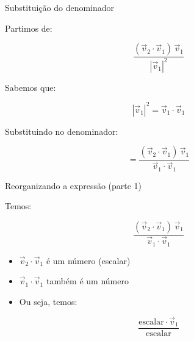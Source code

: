 \documentclass{beamer}
\begin{document}
\begin{frame}{Substituição do denominador}


\vspace{0.5cm}

Partimos de:

\[
\frac{(\vec{v}_2 \cdot \vec{v}_1)\,\vec{v}_1}{|\vec{v}_1|^2}
\]


\vspace{0.5cm}

Sabemos que:

\[
|\vec{v}_1|^2 = \vec{v}_1 \cdot \vec{v}_1
\]


\vspace{0.5cm}

Substituindo no denominador:

\[
=
\frac{(\vec{v}_2 \cdot \vec{v}_1)\,\vec{v}_1}{\vec{v}_1 \cdot \vec{v}_1}
\]

\end{frame}
\begin{frame}{Reorganizando a expressão (parte 1)}


\vspace{0.5cm}

Temos:

\[
\frac{(\vec{v}_2 \cdot \vec{v}_1)\,\vec{v}_1}{\vec{v}_1 \cdot \vec{v}_1}
\]

\vspace{0.5cm}

\begin{itemize}
    \item $\vec{v}_2 \cdot \vec{v}_1$ é um número (escalar)
    \item $\vec{v}_1 \cdot \vec{v}_1$ também é um número
\end{itemize}

\vspace{0.5cm}

\begin{itemize}
    \item Ou seja, temos:
\end{itemize}

\vspace{0.3cm}

\[
\frac{\text{escalar} \cdot \vec{v}_1}{\text{escalar}}
\]

\end{frame}
\end{document}
